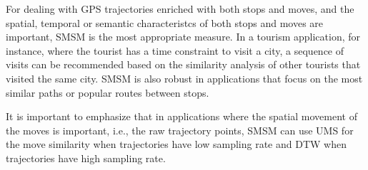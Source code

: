 {For dealing with GPS trajectories enriched with both stops and moves, and the spatial, temporal or semantic characteristcs of both stops and moves are important, SMSM is the most appropriate measure. In a tourism application, for instance, where the tourist has a time constraint to visit a city, a sequence of visits can be recommended based on the similarity analysis of other tourists that visited the same city. SMSM is also robust in applications that focus on the most similar paths or popular routes between stops.}

{It is important to emphasize that in applications where the spatial movement of the moves is important, i.e., the raw trajectory points, SMSM can use UMS for the move similarity when trajectories have low sampling rate and DTW when trajectories have high sampling rate.}
